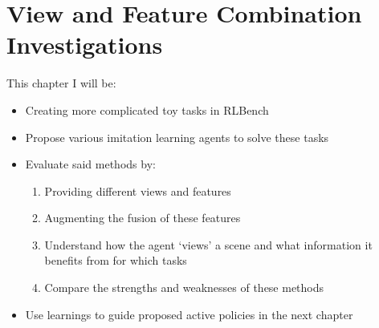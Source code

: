 \chapter{View and Feature Combination Investigations}
This chapter I will be:
\begin{itemize}
  \item Creating more complicated toy tasks in RLBench
  \item Propose various imitation learning agents to solve these tasks
  \item Evaluate said methods by:
  \begin{enumerate}
    \item Providing different views and features
    \item Augmenting the fusion of these features
    \item Understand how the agent `views' a scene and what information it benefits from for which tasks
    \item Compare the strengths and weaknesses of these methods
  \end{enumerate}
  \item Use learnings to guide proposed active policies in the next chapter 
  
\end{itemize}












